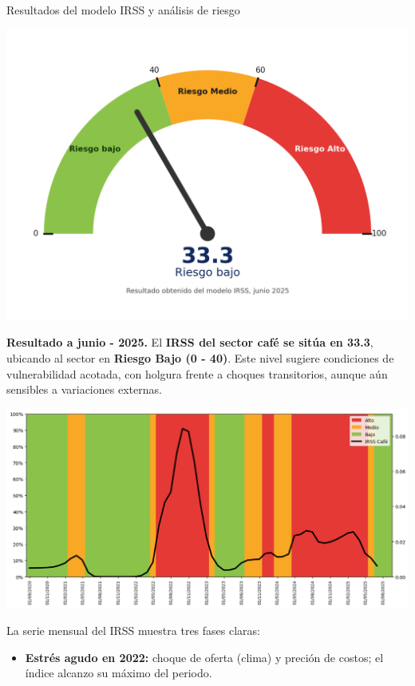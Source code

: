 \documentclass[final]{beamer}
\newlength{\colwidth}
\begin{document}
\begin{frame}[t]
\begin{columns}[t]
\begin{column}{\colwidth}
\begin{block}{Resultados del modelo IRSS y análisis de riesgo}
   \begin{center}
    \includegraphics[scale=1.2]{fig2.png}
   \end{center}
   
      \textbf{Resultado a junio - 2025.}  El \textbf{IRSS del sector café se sitúa en 33.3}, ubicando al sector en \textbf{Riesgo Bajo (0 - 40)}. Este nivel sugiere condiciones de vulnerabilidad acotada, con holgura frente a choques transitorios, aunque aún sensibles a variaciones externas.  
      
    \begin{center}
    \includegraphics[scale=0.8]{fig3.png}
   \end{center}
      
   La serie mensual del IRSS muestra tres fases claras: 
   
   \begin{itemize}
   \item \textbf{Estrés agudo en 2022:} choque de oferta (clima) y preción de costos; el índice alcanzo su máximo del periodo. 
   \end{itemize}


\end{block}
\end{column}
\end{columns}
\end{frame}
\end{document}
